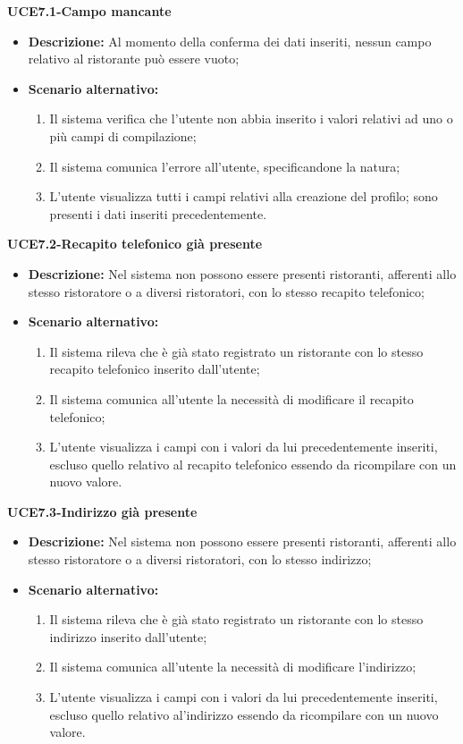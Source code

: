 \pagebreak

\textbf{UCE7.1-Campo mancante}
\begin{itemize}
    \item \textbf{Descrizione:} Al momento della conferma dei dati inseriti, nessun campo relativo al ristorante può essere vuoto;
    \item \textbf{Scenario alternativo:}
    \begin{enumerate}
        \item Il sistema verifica che l'utente non abbia inserito i valori relativi ad uno o più campi di compilazione;
        \item Il sistema comunica l'errore all'utente, specificandone la natura;
        \item L'utente visualizza tutti i campi relativi alla creazione del profilo; sono presenti i dati inseriti precedentemente.
    \end{enumerate}
\end{itemize}

\textbf{UCE7.2-Recapito telefonico già presente}
\begin{itemize}
    \item \textbf{Descrizione:} Nel sistema non possono essere presenti ristoranti, afferenti allo stesso ristoratore o a diversi ristoratori, con lo stesso recapito telefonico;
    \item \textbf{Scenario alternativo:}
    \begin{enumerate}
        \item Il sistema rileva che è già stato registrato un ristorante con lo stesso recapito telefonico inserito dall'utente;
        \item Il sistema comunica all'utente la necessità di modificare il recapito telefonico;
        \item L'utente visualizza i campi con i valori da lui precedentemente inseriti, escluso quello relativo al recapito telefonico essendo da ricompilare con un nuovo valore.
    \end{enumerate}
\end{itemize}

\textbf{UCE7.3-Indirizzo già presente}
\begin{itemize}
    \item \textbf{Descrizione:} Nel sistema non possono essere presenti ristoranti, afferenti allo stesso ristoratore o a diversi ristoratori, con lo stesso indirizzo;
    \item \textbf{Scenario alternativo:}
    \begin{enumerate}
        \item Il sistema rileva che è già stato registrato un ristorante con lo stesso indirizzo inserito dall'utente;
        \item Il sistema comunica all'utente la necessità di modificare l'indirizzo;
        \item L'utente visualizza i campi con i valori da lui precedentemente inseriti, escluso quello relativo al'indirizzo essendo da ricompilare con un nuovo valore.
    \end{enumerate}
\end{itemize}


